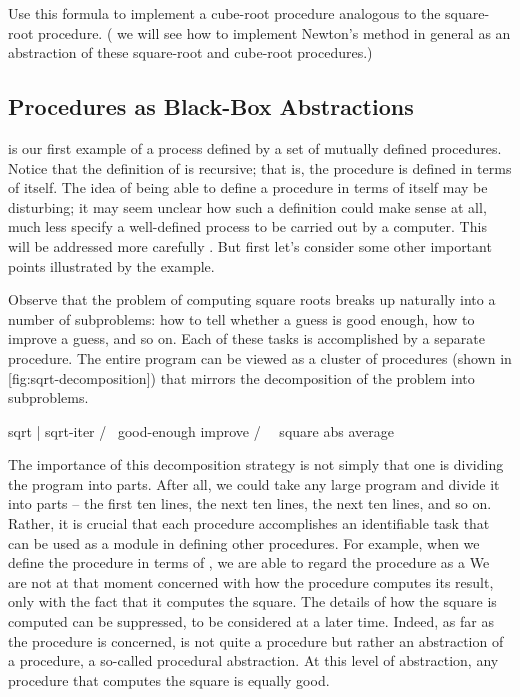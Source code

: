 \startformula
\stopformula

Use this formula to implement a cube-root procedure analogous to the square-root procedure.
( we will see how to implement Newton's method
in general as an abstraction of these square-root and cube-root procedures.)
\endexercise

\subsection{Procedures as Black-Box Abstractions}

 is our first example of a process defined by a set of mutually defined procedures.
Notice that the definition of  is recursive;
that is, the procedure is defined in terms of itself.
The idea of being able to define a procedure in terms of itself may be disturbing;
it may seem unclear how such a  definition could make sense at all,
much less specify a well-defined process to be carried out by a computer.
This will be addressed more carefully .
But first let's consider some other important points illustrated by the  example.

Observe that the problem of computing square roots breaks up naturally into a number of subproblems:
how to tell whether a guess is good enough, how to improve a guess, and so on.
Each of these tasks is accomplished by a separate procedure.
The entire  program can be viewed as a cluster of procedures
(shown in [fig:sqrt-decomposition])
that mirrors the decomposition of the problem into subproblems.

            {
\starttyping
             sqrt
              |
          sqrt-iter
          /       \
  good-enough    improve
    /     \          \
square    abs      average
\stoptyping
             }

The importance of this decomposition strategy is not simply that one is dividing the program into parts.
After all, we could take any large program and divide it into parts
-- the first ten lines, the next ten lines, the next ten lines, and so on.
Rather, it is crucial that each procedure accomplishes an identifiable task
that can be used as a module in defining other procedures.
For example, when we define the \exp{good-enough?} procedure in terms of ,
we are able to regard the \exp{square} procedure as a 
We are not at that moment concerned with how the procedure computes its result,
only with the fact that it computes the square.
The details of how the square is computed can be suppressed, to be considered at a later time.
Indeed, as far as the \exp{good-enough?} procedure is concerned,
\exp{square} is not quite a procedure but rather an abstraction of a procedure, a so-called procedural abstraction.
At this level of abstraction, any procedure that computes the square is equally good.

